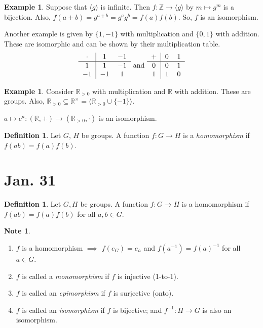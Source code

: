 \documentclass{amsart}
\theoremstyle{definition}
\newtheorem{definition}[thm]{Definition}
\newtheorem{example}[thm]{Example}
\newtheorem{note}[thm]{Note}
\newcommand{\R}{\mathbb R}
\newcommand{\Z}{\mathbb Z}
\begin{document}
\begin{example}
Suppose that $\langle g\rangle$ is infinite. Then $f:\Z\to \langle g\rangle$ by $m\mapsto g^m$ is a bijection. Also, $f(a+b)=g^{a+b}=g^ag^b=f(a)f(b)$. So, $f$ is an isomorphism.	
\end{example}
Another example is given by $\{1,-1\}$ with multiplication and $\{0,1\}$ with addition. These are isomorphic and can be shown by their multiplication table.
\begin{equation*}
\begin{tabular}{c|cc}
$\cdot$&$1$&$-1$\\
	\hline
	$1$&$1$&$-1$\\
	$-1$&$-1$&$1$
\end{tabular} \text{ and }
\begin{tabular}{c|cc}
	$+$&$0$&$1$\\
	\hline
	$0$&$0$&$1$\\
	$1$&$1$&$0$
\end{tabular} 
\end{equation*}
\begin{example}
Consider $\R_{>0}$ with multiplication and $\R$ with addition. These are groups. Also, $\R_{>0}\subseteq \R^\times =\langle\R_{>0}\cup \{-1\}\rangle$. 

$a\mapsto e^a: (\R,+)\to (\R_{>0},\cdot)$ is an isomorphism.	
\end{example}
\begin{definition}
	Let $G$, $H$ be groups. A function $f:G\to H$ is a \emph{homomorphism} if $f(ab)=f(a)f(b)$.
\end{definition}
\section{Jan. 31}
\begin{definition}
	Let $G,H$ be groups. A function $f:G\to H$ is a homomorphism if $f(ab)=f(a)f(b)$ for all $a,b\in G$.
\end{definition}
\begin{note}
	\begin{enumerate}
		\item $f$ is a homomorphism $\implies$ $f(e_G)=e_h$ and $f(a^{-1})=f(a)^{-1}$ for all $a\in G$.
		\item $f$ is called a \emph{monomorphism} if $f$ is injective (1-to-1).
		\item $f$ is called an \emph{epimorphism} if $f$ is surjective (onto).
		\item $f$ is called an \emph{isomorphism} if $f$ is bijective; and $f^{-1}:H\to G$ is also an isomorphism.
	\end{enumerate}
\end{note}
\end{document}
